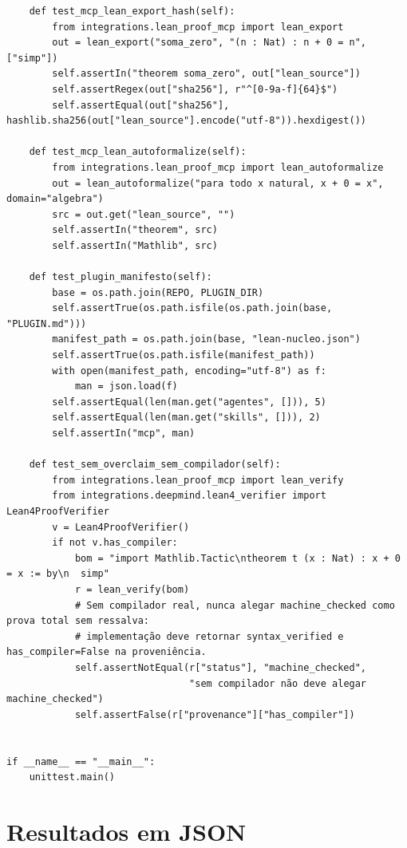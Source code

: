 \documentclass[12pt,openany,oneside,a4paper,brazil,chapter=TITLE]{abntex2}
\begin{document}
\begin{lstlisting}
    def test_mcp_lean_export_hash(self):
        from integrations.lean_proof_mcp import lean_export
        out = lean_export("soma_zero", "(n : Nat) : n + 0 = n", ["simp"])
        self.assertIn("theorem soma_zero", out["lean_source"])
        self.assertRegex(out["sha256"], r"^[0-9a-f]{64}$")
        self.assertEqual(out["sha256"], hashlib.sha256(out["lean_source"].encode("utf-8")).hexdigest())

    def test_mcp_lean_autoformalize(self):
        from integrations.lean_proof_mcp import lean_autoformalize
        out = lean_autoformalize("para todo x natural, x + 0 = x", domain="algebra")
        src = out.get("lean_source", "")
        self.assertIn("theorem", src)
        self.assertIn("Mathlib", src)

    def test_plugin_manifesto(self):
        base = os.path.join(REPO, PLUGIN_DIR)
        self.assertTrue(os.path.isfile(os.path.join(base, "PLUGIN.md")))
        manifest_path = os.path.join(base, "lean-nucleo.json")
        self.assertTrue(os.path.isfile(manifest_path))
        with open(manifest_path, encoding="utf-8") as f:
            man = json.load(f)
        self.assertEqual(len(man.get("agentes", [])), 5)
        self.assertEqual(len(man.get("skills", [])), 2)
        self.assertIn("mcp", man)

    def test_sem_overclaim_sem_compilador(self):
        from integrations.lean_proof_mcp import lean_verify
        from integrations.deepmind.lean4_verifier import Lean4ProofVerifier
        v = Lean4ProofVerifier()
        if not v.has_compiler:
            bom = "import Mathlib.Tactic\ntheorem t (x : Nat) : x + 0 = x := by\n  simp"
            r = lean_verify(bom)
            # Sem compilador real, nunca alegar machine_checked como prova total sem ressalva:
            # implementação deve retornar syntax_verified e has_compiler=False na proveniência.
            self.assertNotEqual(r["status"], "machine_checked",
                                "sem compilador não deve alegar machine_checked")
            self.assertFalse(r["provenance"]["has_compiler"])


if __name__ == "__main__":
    unittest.main()
\end{lstlisting}

\chapter{Resultados em JSON}
\label{ap:json}
\end{document}
